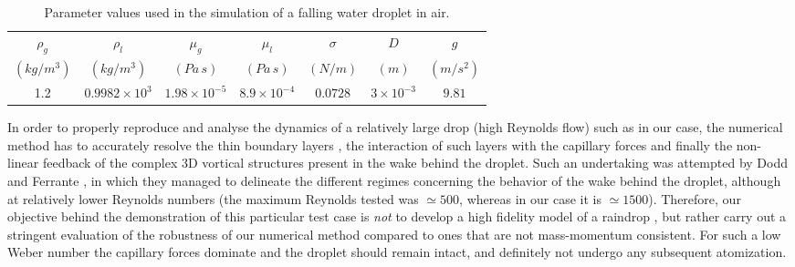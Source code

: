 \begin{table}[h!]
\begin{center}
\begin{tabular}{ccccccc}
\hline\hline
$\rho_{g}$ & $\rho_{l}$ & $\mu_{g}$ 
& $\mu_{l}$ & $\sigma$ & $D$ & $g$\\
$\left(kg/m^3\right)$ & $\left(kg/m^3\right)$ & $\left(Pa \, s\right)$ 
& $\left(Pa \,s \right)$ & $\left(N/m\right)$ & $(m)$ & $(m /s^{2})$ \\
\hline
1.2 & $0.9982 \times 10^3$ & $1.98 \times 10^{-5}$ & 
$8.9 \times 10^{-4}$ & $0.0728$ & $3 \times 10^{-3}$ & $9.81$\\
\hline\hline
\end{tabular}
\caption{Parameter values used in the simulation 
	of a falling water droplet in air. \label{raindropprop}}
\end{center}
\end{table}


In order to properly reproduce and analyse the dynamics 
of a relatively large drop (high Reynolds flow) such as in our case, 
the numerical method has to accurately resolve the thin boundary layers 
, 
the interaction of such layers with the capillary forces and finally 
the non-linear feedback of the complex 
3D vortical structures present in the wake behind the droplet. 
Such an undertaking was attempted by Dodd and Ferrante \cite{dodd2014}, 
in which they managed to delineate the different regimes concerning the 
behavior of the wake behind the droplet, although at relatively 
lower Reynolds numbers (the maximum Reynolds tested was $\simeq 500$, 
whereas in our case it is $\simeq 1500$).    
Therefore, our objective behind the demonstration of this particular 
test case is \textit{not} to develop a high fidelity model of a raindrop 
, 
but rather carry out a stringent evaluation of the robustness of our numerical 
method compared to ones that are not mass-momentum consistent. 
For such a low Weber number the capillary forces dominate and the 
droplet should remain intact, and definitely not undergo any subsequent atomization. 


